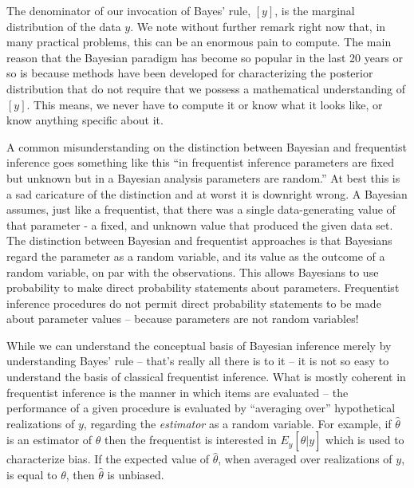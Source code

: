 The denominator of our invocation of Bayes' rule, $[y]$,
is the marginal distribution of the data $y$.  We note without further
remark right now that, in many practical problems, this can be an
enormous pain to compute. The main reason that the Bayesian paradigm
has become so popular in the last 20 years or so is because methods
have been developed
for characterizing the posterior distribution that do not
require that we possess a mathematical understanding of $[y]$. This means,
we never have to compute it or know what it looks like, or know
anything specific about it.

A common misunderstanding on the distinction between Bayesian and
frequentist inference goes something like this ``in frequentist
inference parameters are fixed but unknown but in a Bayesian analysis
parameters are random.'' At best this is a sad caricature of the
distinction and at worst it is downright wrong. A Bayesian
assumes, just like a frequentist, that there was a single
data-generating value of that parameter - a fixed, and unknown value
that produced the given data set.
The distinction between Bayesian and frequentist approaches is that
Bayesians regard the parameter as a random variable, and its value as
the outcome of a random variable, on par with the observations. This
allows Bayesians to use probability to make direct probability
statements about parameters. Frequentist inference procedures do not
permit direct probability statements to be made about parameter
values -- because parameters are not random variables!

While we can understand the conceptual basis of Bayesian inference
merely by understanding Bayes' rule -- that's really all there is to it
-- it is not so easy to understand the basis of classical
frequentist inference. 
What is mostly coherent
in frequentist inference is the manner in which items are evaluated -- the performance of a given procedure is
evaluated by ``averaging over'' hypothetical realizations of $y$,
regarding the {\it estimator} as a random variable. For example, if
$\hat{\theta}$ is an estimator of $\theta$ then the frequentist is
interested in $E_{y}[\hat{\theta}|y]$ which is used to characterize
bias. If the expected value of $\hat{\theta}$, when averaged over
realizations of $y$, is equal to $\theta$, then $\hat{\theta}$ is
unbiased.

